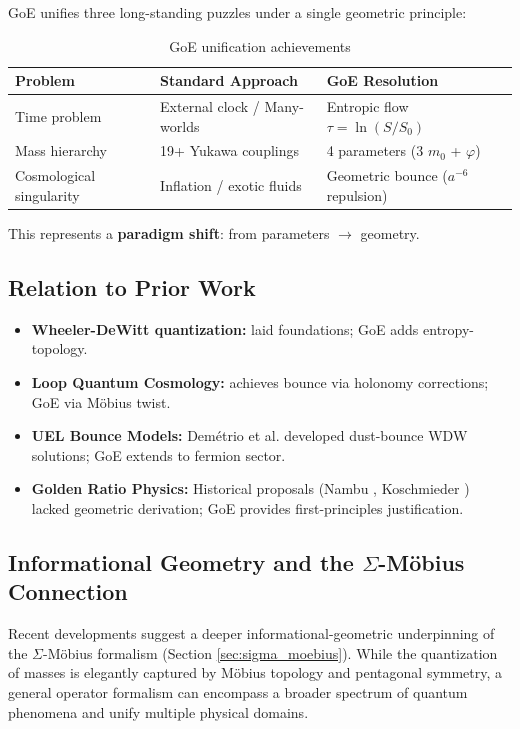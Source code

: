 \documentclass[12pt]{article}
\theoremstyle{definition}
\theoremstyle{plain}
\begin{document}
GoE unifies three long-standing puzzles under a single geometric principle:

\begin{table}[H]
\centering
\caption{GoE unification achievements}
\small
\begin{tabular}{p{3.5cm}p{4cm}p{4.5cm}}
\toprule
\textbf{Problem} & \textbf{Standard Approach} & \textbf{GoE Resolution} \\
\midrule
Time problem & External clock / Many-worlds & Entropic flow $\tau = \ln(S/S_0)$ \\
Mass hierarchy & 19+ Yukawa couplings & 4 parameters (3 $m_0$ + $\varphi$) \\
Cosmological singularity & Inflation / exotic fluids & Geometric bounce ($a^{-6}$ repulsion) \\
\bottomrule
\end{tabular}
\end{table}

This represents a \textbf{paradigm shift}: from parameters $\to$ geometry.

\subsection{Relation to Prior Work}

\begin{itemize}
\item \textbf{Wheeler-DeWitt quantization:} \cite{wheeler1968,dewitt1967} laid foundations; GoE adds entropy-topology.
\item \textbf{Loop Quantum Cosmology:} \cite{ashtekar2006,kisielowski2022} achieves bounce via holonomy corrections; GoE via M\"obius twist.
\item \textbf{UEL Bounce Models:} Demétrio et al. \cite{barroso2024,demetrio2025} developed dust-bounce WDW solutions; GoE extends to fermion sector.
\item \textbf{Golden Ratio Physics:} Historical proposals (Nambu \cite{nambu1960}, Koschmieder \cite{koschmieder1986}) lacked geometric derivation; GoE provides first-principles justification.
\end{itemize}

\subsection{Informational Geometry and the $\Sigma$-M\"obius Connection}
\label{sec:sigma_moebius_info}

Recent developments suggest a deeper informational-geometric underpinning of the $\Sigma$-M\"obius formalism (Section \ref{sec:sigma_moebius}). While the quantization of masses is elegantly captured by M\"obius topology and pentagonal symmetry, a general operator formalism can encompass a broader spectrum of quantum phenomena and unify multiple physical domains.
\end{document}

